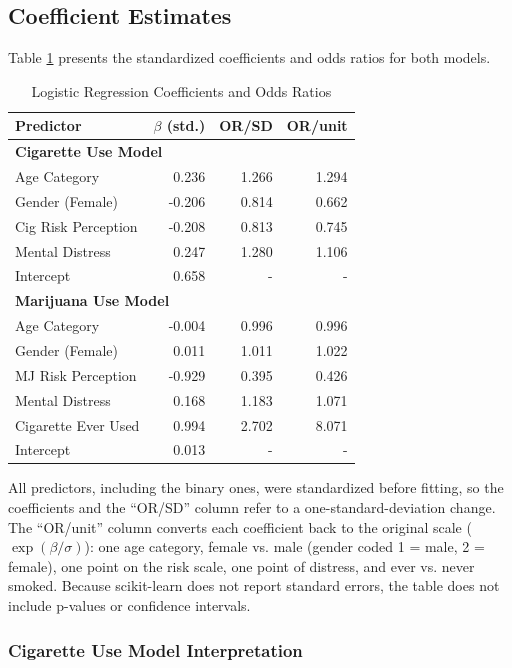 \documentclass[conference]{IEEEtran}
\begin{document}
\subsection{Coefficient Estimates}

Table \ref{tab:coef} presents the standardized coefficients and odds ratios for both models.

\begin{table}[htbp]
\centering
\caption{Logistic Regression Coefficients and Odds Ratios}
\label{tab:coef}
\small
\begin{tabular}{@{}lrrr@{}}
\toprule
\textbf{Predictor} & \textbf{$\beta$ (std.)} & \textbf{OR/SD} & \textbf{OR/unit} \\ \midrule
\multicolumn{4}{l}{\textbf{Cigarette Use Model}} \\ \midrule
Age Category & 0.236 & 1.266 & 1.294 \\
Gender (Female) & -0.206 & 0.814 & 0.662 \\
Cig Risk Perception & -0.208 & 0.813 & 0.745 \\
Mental Distress & 0.247 & 1.280 & 1.106 \\
Intercept & 0.658 & - & - \\ \midrule
\multicolumn{4}{l}{\textbf{Marijuana Use Model}} \\ \midrule
Age Category & -0.004 & 0.996 & 0.996 \\
Gender (Female) & 0.011 & 1.011 & 1.022 \\
MJ Risk Perception & -0.929 & 0.395 & 0.426 \\
Mental Distress & 0.168 & 1.183 & 1.071 \\
Cigarette Ever Used & 0.994 & 2.702 & 8.071 \\
Intercept & 0.013 & - & - \\ \bottomrule
\end{tabular}
\end{table}

All predictors, including the binary ones, were standardized before fitting, so the coefficients and the ``OR/SD'' column refer to a one-standard-deviation change. The ``OR/unit'' column converts each coefficient back to the original scale ($\exp(\beta/\sigma)$): one age category, female vs. male (gender coded 1 = male, 2 = female), one point on the risk scale, one point of distress, and ever vs. never smoked. Because scikit-learn does not report standard errors, the table does not include p-values or confidence intervals.

\subsubsection{Cigarette Use Model Interpretation}
\end{document}
